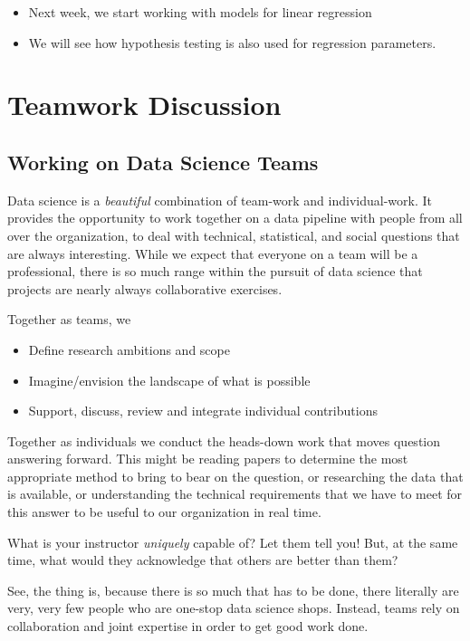 \documentclass[
]{book}
\providecommand{\tightlist}{%
  \setlength{\itemsep}{0pt}\setlength{\parskip}{0pt}}
\theoremstyle{definition}
\theoremstyle{definition}
\theoremstyle{definition}
\theoremstyle{definition}
\theoremstyle{remark}
\begin{document}
\begin{itemize}
\tightlist
\item
  Next week, we start working with models for linear regression
\item
  We will see how hypothesis testing is also used for regression parameters.
\end{itemize}

\section{Teamwork Discussion}\label{teamwork-discussion}

\subsection{Working on Data Science Teams}\label{working-on-data-science-teams}

Data science is a \emph{beautiful} combination of team-work and individual-work. It provides the opportunity to work together on a data pipeline with people from all over the organization, to deal with technical, statistical, and social questions that are always interesting. While we expect that everyone on a team will be a professional, there is so much range within the pursuit of data science that projects are nearly always collaborative exercises.

Together as teams, we

\begin{itemize}
\tightlist
\item
  Define research ambitions and scope
\item
  Imagine/envision the landscape of what is possible
\item
  Support, discuss, review and integrate individual contributions
\end{itemize}

Together as individuals we conduct the heads-down work that moves question answering forward. This might be reading papers to determine the most appropriate method to bring to bear on the question, or researching the data that is available, or understanding the technical requirements that we have to meet for this answer to be useful to our organization in real time.

What is your instructor \emph{uniquely} capable of? Let them tell you! But, at the same time, what would they acknowledge that others are better than them?

See, the thing is, because there is so much that has to be done, there literally are very, very few people who are one-stop data science shops. Instead, teams rely on collaboration and joint expertise in order to get good work done.
\end{document}
